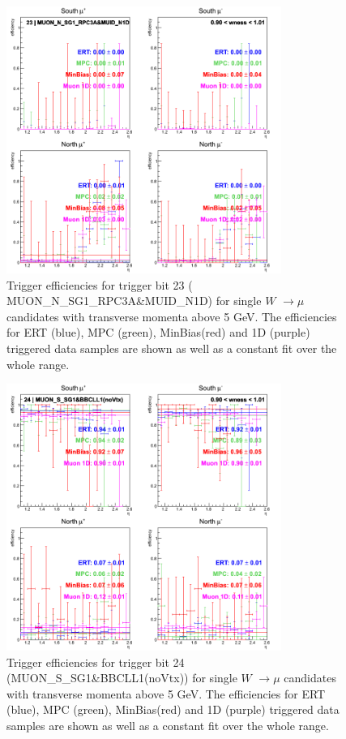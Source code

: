\begin{figure}[ht]
\begin{center}
\includegraphics[width=0.8\textwidth]{./figures/run13_trigeffieta_w1_trig23_lin.png}
\caption{\label{fig:run13_trigeffieta_w0_nper0_trig23_lin} Trigger efficiencies for trigger bit 23 ( MUON\_N\_SG1\_RPC3A\&MUID\_N1D) for single $W$ $\rightarrow \mu$ candidates with transverse momenta above 5 GeV. The efficiencies for ERT (blue), MPC (green), MinBias(red) and 1D (purple) triggered data samples are shown as well as a constant fit over the whole range.}
\end{center}
\end{figure}
\begin{figure}[ht]
\begin{center}
\includegraphics[width=0.8\textwidth]{./figures/run13_trigeffieta_w1_trig24_lin.png}
\caption{\label{fig:run13_trigeffieta_w0_nper0_trig24_lin} Trigger efficiencies for trigger bit 24 (MUON\_S\_SG1\&BBCLL1(noVtx)) for single $W$ $\rightarrow \mu$ candidates with transverse momenta above 5 GeV. The efficiencies for ERT (blue), MPC (green), MinBias(red) and 1D (purple) triggered data samples are shown as well as a constant fit over the whole range.}
\end{center}
\end{figure}
